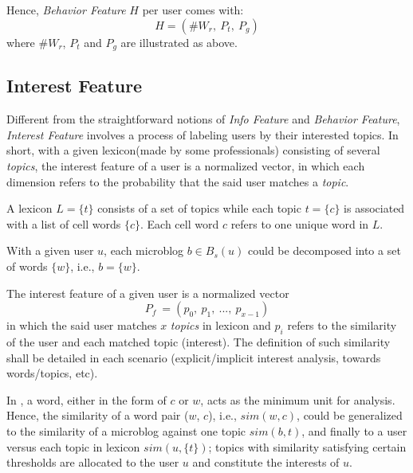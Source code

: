 Hence, \textit{Behavior Feature} $H$ per user comes with:
\begin{equation}
\label{eq:beha}
	H = (\#W_r,\ P_t,\ P_g)
\end{equation}
where $\#W_r$, $P_t$ and $P_g$ are illustrated as above.

\subsection{Interest Feature}

Different from the straightforward notions of \textit{Info Feature} and \textit{Behavior Feature}, \textit{Interest Feature} involves a process of labeling users by their interested topics.
In short, with a given lexicon(made by some professionals) consisting of several \textit{topics}, the interest feature of a user is a normalized vector, in which each dimension refers to the probability that the said user matches a \textit{topic}.

\begin{definition}
\label{def:lexi}
A lexicon $L = \{t\}$ consists of a set of topics while each topic $t = \{c\}$ is associated with a list of cell words $\{c\}$. Each cell word $c$ refers to one unique word in $L$.
\end{definition}

\begin{definition}
\label{def:bw}
With a given user $u$, each microblog $b \in B_s(u)$ could be decomposed into a set of words $\{w\}$, i.e., $b = \{w\}$.
\end{definition}

\begin{definition}
\label{def:inte}
The interest feature of a given user is a normalized vector
\begin{equation}
\label{eq:inte}
P_f\ = (p_0,\ p_1,\ ...,\ p_{x-1})
\end{equation}
in which the said user matches $x$ \textit{topics} in lexicon and $p_i$ refers to the similarity of the user and each matched topic (interest). The definition of such similarity shall be detailed in each scenario (explicit/implicit interest analysis, towards words/topics, etc).
\end{definition}

In \sys{}, a word, either in the form of $c$ or $w$, acts as the minimum unit for analysis.
Hence, the similarity of a word pair ($w$, $c$), i.e., $sim(w, c)$, could be generalized to the similarity of a microblog against one topic $sim(b, t)$, and finally to a user versus each topic in lexicon $sim(u, \{t\})$; topics with similarity satisfying certain thresholds are allocated to the user $u$ and constitute the interests of $u$.

